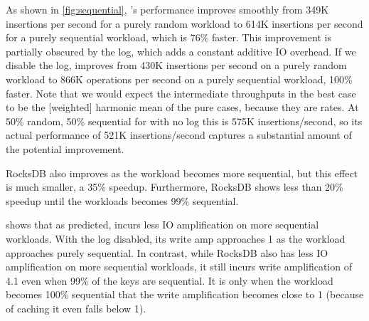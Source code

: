 As shown in \cref{fig:sequential}, \sysname's performance improves smoothly
from 349K insertions per second for a purely random workload to 614K insertions
per second for a purely sequential workload, which is 76\% faster. This
improvement is partially obscured by the log, which adds a constant additive IO
overhead. If we disable the log, \sysname improves from 430K insertions per
second on a purely random workload to 866K operations per second on a purely
sequential workload, 100\% faster. Note that we would expect the intermediate
throughputs in the best case to be the [weighted] harmonic mean of the pure
cases, because they are rates. At 50\% random, 50\% sequential for \sysname
with no log this is 575K insertions/second, so its actual performance of 521K
insertions/second captures a substantial amount of the potential improvement.

RocksDB also improves as the workload becomes more sequential, but this effect
is much smaller, a 35\% speedup. Furthermore, RocksDB shows less than 20\%
speedup until the workloads becomes 99\% sequential.

 shows that as predicted, \sysname incurs less IO
amplification on more sequential workloads. With the log disabled, its write
amp approaches 1 as the workload approaches purely sequential.  In contrast,
while RocksDB also has less IO amplification on more sequential workloads, it
still incurs write amplification of 4.1 even when 99\% of the keys are
sequential. It is only when the workload becomes 100\% sequential that the
write amplification becomes close to 1 (because of caching it even falls below
1).

